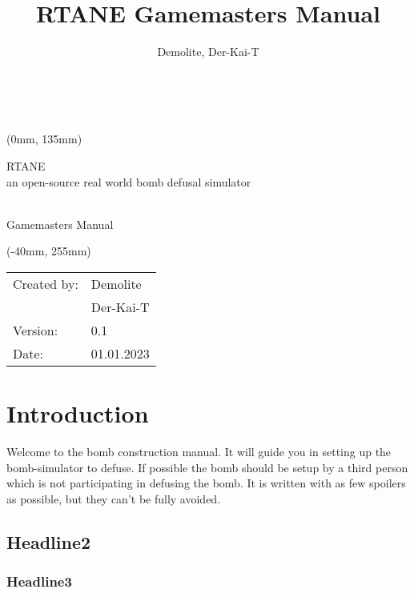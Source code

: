 \documentclass[11pt]{scrartcl}
\title{RTANE Gamemasters Manual}
\author{Demolite, Der-Kai-T}
\begin{document}
\begin{titlepage}




\centering


\ \\



\begin{textblock*}{210mm}(0mm, 135mm)

{\fontsize{18}{16} \selectfont RTANE } \\
{\fontsize{20}{18} \selectfont an open-source real world bomb defusal simulator }

\ \\

{\fontsize{28}{40} \selectfont Gamemasters Manual}
\ \\




\end{textblock*}


\begin{textblock*}{180mm}(-40mm, 255mm)
\begin{tabular}{ll}
Created by: & Demolite \\
 & Der-Kai-T\\
 
 Version: & 0.1 \\
 Date: & 01.01.2023 \\

\end{tabular}

\end{textblock*}


\end{titlepage}




\pagebreak
\tableofcontents
\pagebreak

\section{Introduction}
Welcome to the bomb construction manual. It will guide you in setting up the bomb-simulator to defuse. If possible the bomb should be setup by a third person which is not participating in defusing the bomb. It is written with as few spoilers as possible, but they can't be fully avoided.


\subsection{Headline2}

\subsubsection{Headline3}



\end{document}
